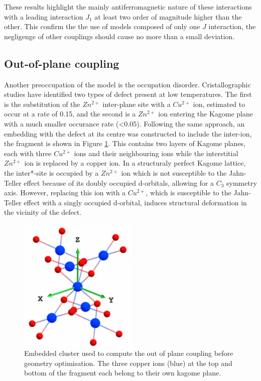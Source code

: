 \documentclass[10pt]{report}
\numberwithin{equation}{section}
\begin{document}
These results highlight the mainly antiferromagnetic nature of these interactions with a leading interaction $J_1$ at least two order of magnitude higher than the other.
This confirm the the use of models composed of only one $J$ interaction, the negligenge of other couplings should cause no more than a small deviation.

\subsection{Out-of-plane coupling}

Another preoccupation of the model is the occupation disorder. Cristallographic studies have identified two types of defect present at low temperatures. 
The first is the substitution of the $Zn^{2+}$ inter-plane site with a $Cu^{2+}$ ion, estimated to occur at a rate of 0.15, and the second is a $Zn^{2+}$ ion entering the Kagome plane with a much smaller occurance rate (<0.05).
Following the same approach, an embedding with the defect at its centre was constructed to include the inter-ion, the fragment is shown in Figure \ref{fig:FragAv}.
This contains two layers of Kagome planes, each with three $Cu^{2+}$ ions and their neighbouring ions while the interstitial $Zn^{2+}$ ion is replaced by a copper ion.
In a structuraly perfect Kagome lattice, the inter*-site is occupied by a $Zn^{2+}$ ion which is not susceptible to the Jahn-Teller effect because of its doubly occupied d-orbitals, allowing for a $C_3$ symmetry axis.
However, replacing this ion with a $Cu^{2+}$, which is susceptible to the Jahn-Teller effect with a singly occupied d-orbital, induces structural deformation in the vicinity of the defect.

\begin{figure}[!ht]
    \centering
    \includegraphics[width=0.5\textwidth]{Images/Fragment_AvOpt.png}
    \caption{Embedded cluster used to compute the out of plane coupling before geometry optimisation. The three copper ions (blue) at the top and bottom of the fragment each belong to their own kagome plane.}
    \label{fig:FragAv}
\end{figure}
\end{document}

